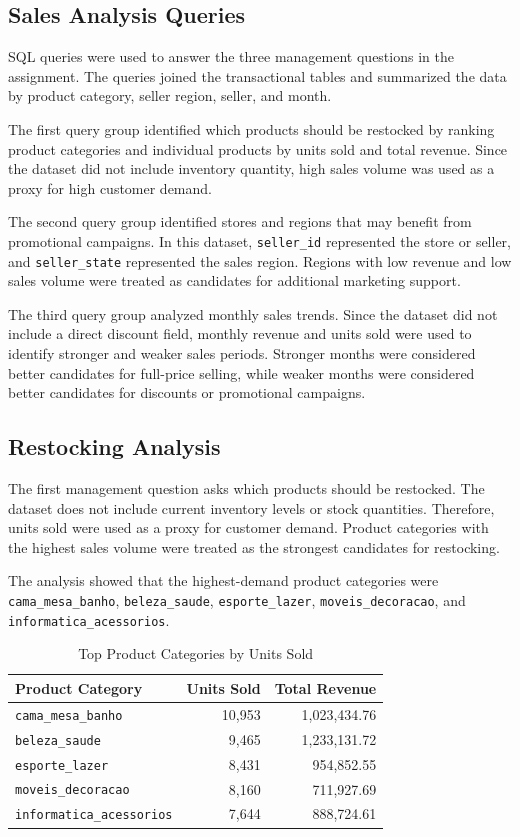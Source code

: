 \documentclass[12pt]{article}
\begin{document}
\subsection{Sales Analysis Queries}

SQL queries were used to answer the three management questions in the assignment.
The queries joined the transactional tables and summarized the data by product
category, seller region, seller, and month.

The first query group identified which products should be restocked by ranking
product categories and individual products by units sold and total revenue. Since
the dataset did not include inventory quantity, high sales volume was used as a
proxy for high customer demand.

The second query group identified stores and regions that may benefit from
promotional campaigns. In this dataset, \texttt{seller\_id} represented the
store or seller, and \texttt{seller\_state} represented the sales region. Regions
with low revenue and low sales volume were treated as candidates for additional
marketing support.

The third query group analyzed monthly sales trends. Since the dataset did not
include a direct discount field, monthly revenue and units sold were used to
identify stronger and weaker sales periods. Stronger months were considered
better candidates for full-price selling, while weaker months were considered
better candidates for discounts or promotional campaigns.


\subsection{Restocking Analysis}

The first management question asks which products should be restocked. The dataset
does not include current inventory levels or stock quantities. Therefore, units sold
were used as a proxy for customer demand. Product categories with the highest sales
volume were treated as the strongest candidates for restocking.

The analysis showed that the highest-demand product categories were
\texttt{cama\_mesa\_banho}, \texttt{beleza\_saude}, \texttt{esporte\_lazer},
\texttt{moveis\_decoracao}, and \texttt{informatica\_acessorios}.

\begin{table}[H]
\centering
\begin{tabular}{lrr}
\toprule
Product Category & Units Sold & Total Revenue \\
\midrule
\texttt{cama\_mesa\_banho} & 10,953 & 1,023,434.76 \\
\texttt{beleza\_saude} & 9,465 & 1,233,131.72 \\
\texttt{esporte\_lazer} & 8,431 & 954,852.55 \\
\texttt{moveis\_decoracao} & 8,160 & 711,927.69 \\
\texttt{informatica\_acessorios} & 7,644 & 888,724.61 \\
\bottomrule
\end{tabular}
\caption{Top Product Categories by Units Sold}
\end{table}
\end{document}
